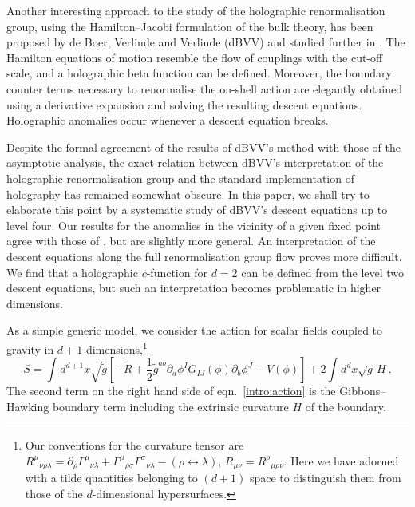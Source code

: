 \documentclass[a4paper,12pt]{article}
\begin{document}
Another interesting approach to the study of the holographic
renormalisation group, using the Hamilton--Jacobi formulation of the
bulk theory, has been proposed by de Boer, Verlinde and
Verlinde (dBVV) \cite{deBoer00a,Verlinde00a,Verlinde00b,deBoer01a} and
studied further in
\cite{Campos00,Fukuma00a,Fukuma00b,Kalkkinen00,Nojiri00d,Kalkkinen01a}.  
The Hamilton equations of motion resemble the flow of couplings with the
cut-off scale, and a holographic beta function can be defined. 
Moreover, the boundary counter terms necessary to
renormalise the on-shell action are elegantly obtained using a
derivative expansion and solving the resulting descent
equations. Holographic anomalies occur whenever a descent equation 
breaks.

Despite the formal agreement of the results of dBVV's method with
those of the asymptotic analysis, the exact relation between dBVV's
interpretation of the holographic renormalisation group and the
standard implementation of holography has remained somewhat obscure.
In this paper, we shall try to elaborate this point by a systematic
study of dBVV's descent equations up to level four. Our results for
the anomalies in the vicinity of a given fixed point agree with those
of \cite{deHaro00a}, but are slightly more general. 
An interpretation of the descent equations along the full
renormalisation group flow proves more difficult. We find that a
holographic $c$-function for $d=2$ can be defined from the level two
descent equations, but such an interpretation becomes problematic in
higher dimensions. 

As a simple generic model, we consider the action for scalar fields
coupled to gravity in $d+1$ dimensions,\footnote{Our conventions for
the curvature tensor are 
$R^\mu{}_{\nu\rho\lambda}=\partial_\rho \Gamma^\mu{}_{\nu\lambda} +
\Gamma^\mu{}_{\rho\sigma}\Gamma^\sigma{}_{\nu\lambda}
-(\rho\leftrightarrow\lambda)$, $R_{\mu\nu}=R^\rho{}_{\mu\rho\nu}$.
Here we have adorned with a tilde quantities belonging to $(d+1)$ space
to distinguish them from those of the $d$-dimensional
hypersurfaces.} 
\begin{equation}
\label{intro:action}
  S = \int d^{d+1}x \sqrt{\tilde{g}} \left[ - \tilde{R} +\frac12
   \tilde{g}^{ab} \partial_a \phi^I G_{IJ}(\phi) \partial_b \phi^J -
  V(\phi) \right] + 2 \int d^d x \sqrt{g}\, H~.
\end{equation}
The second term on the right hand side of
eqn.\ \eqref{intro:action} is the Gibbons--Hawking boundary term
including the extrinsic curvature $H$ of the boundary.
\end{document}
